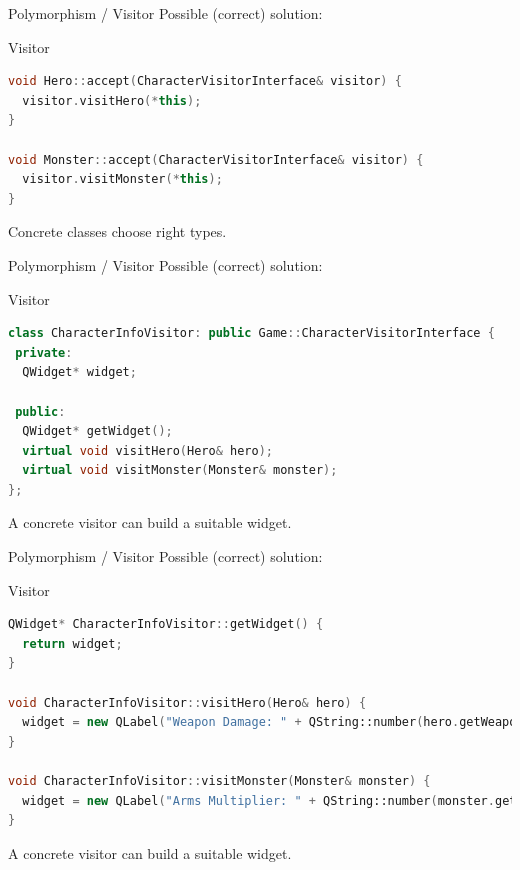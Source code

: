 \documentclass[11pt]{beamer}
\begin{document}
\begin{frame}[fragile]{Polymorphism / Visitor}
 Possible (correct) solution:
 
 \begin{center}
  Visitor
 \end{center}
 
  \begin{lstlisting}[language=C++]
void Hero::accept(CharacterVisitorInterface& visitor) {
  visitor.visitHero(*this);
}

void Monster::accept(CharacterVisitorInterface& visitor) {
  visitor.visitMonster(*this);
}
\end{lstlisting}
 
 Concrete classes choose right types.
\end{frame}

\begin{frame}[fragile]{Polymorphism / Visitor}
 Possible (correct) solution:
 
 \begin{center}
  Visitor
 \end{center}
 
  \begin{lstlisting}[language=C++]
class CharacterInfoVisitor: public Game::CharacterVisitorInterface {
 private:
  QWidget* widget;

 public:
  QWidget* getWidget();
  virtual void visitHero(Hero& hero);
  virtual void visitMonster(Monster& monster);
};
\end{lstlisting}
 
 A concrete visitor can build a suitable widget.
\end{frame}

\begin{frame}[fragile]{Polymorphism / Visitor}
 Possible (correct) solution:
 
 \begin{center}
  Visitor
 \end{center}
 
  \begin{lstlisting}[language=C++]
QWidget* CharacterInfoVisitor::getWidget() {
  return widget;
}

void CharacterInfoVisitor::visitHero(Hero& hero) {
  widget = new QLabel("Weapon Damage: " + QString::number(hero.getWeaponDamage()));
}

void CharacterInfoVisitor::visitMonster(Monster& monster) {
  widget = new QLabel("Arms Multiplier: " + QString::number(monster.getArms()));
}
\end{lstlisting}
 
 A concrete visitor can build a suitable widget.
\end{frame}
\end{document}

